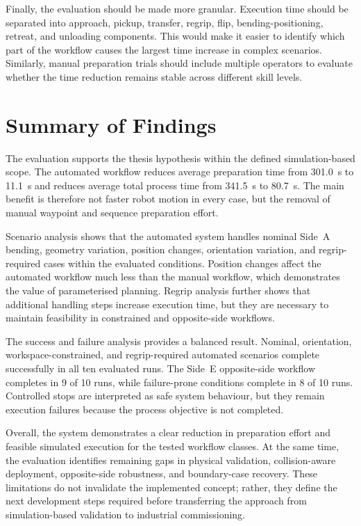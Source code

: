 Finally, the evaluation should be made more granular. Execution time should be separated into approach, pickup, transfer, regrip, flip, bending-positioning, retreat, and unloading components. This would make it easier to identify which part of the workflow causes the largest time increase in complex scenarios. Similarly, manual preparation trials should include multiple operators to evaluate whether the time reduction remains stable across different skill levels.

\section{Summary of Findings}
\label{sec:evaluation-summary-findings}

The evaluation supports the thesis hypothesis within the defined simulation-based scope. The automated workflow reduces average preparation time from \SI{301.0}{\second} to \SI{11.1}{\second} and reduces average total process time from \SI{341.5}{\second} to \SI{80.7}{\second}. The main benefit is therefore not faster robot motion in every case, but the removal of manual waypoint and sequence preparation effort.

Scenario analysis shows that the automated system handles nominal Side~A bending, geometry variation, position changes, orientation variation, and regrip-required cases within the evaluated conditions. Position changes affect the automated workflow much less than the manual workflow, which demonstrates the value of parameterised planning. Regrip analysis further shows that additional handling steps increase execution time, but they are necessary to maintain feasibility in constrained and opposite-side workflows.

The success and failure analysis provides a balanced result. Nominal, orientation, workspace-constrained, and regrip-required automated scenarios complete successfully in all ten evaluated runs. The Side~E opposite-side workflow completes in 9 of 10 runs, while failure-prone conditions complete in 8 of 10 runs. Controlled stops are interpreted as safe system behaviour, but they remain execution failures because the process objective is not completed.

Overall, the system demonstrates a clear reduction in preparation effort and feasible simulated execution for the tested workflow classes. At the same time, the evaluation identifies remaining gaps in physical validation, collision-aware deployment, opposite-side robustness, and boundary-case recovery. These limitations do not invalidate the implemented concept; rather, they define the next development steps required before transferring the approach from simulation-based validation to industrial commissioning.

